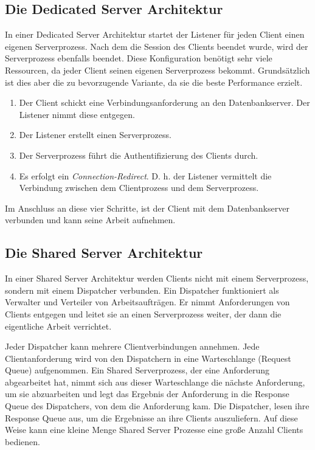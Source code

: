      \subsection{Die Dedicated Server Architektur}
        In einer Dedicated Server Architektur startet der Listener für jeden Client einen eigenen Serverprozess. Nach dem die Session des Clients beendet wurde, wird der Serverprozess ebenfalls beendet. Diese Konfiguration benötigt sehr viele Ressourcen, da jeder Client seinen eigenen Serverprozess bekommt. Grundsätzlich ist dies aber die zu bevorzugende Variante, da sie die beste Performance erzielt.
        \begin{enumerate}
          \item Der Client schickt eine Verbindungsanforderung an den Datenbankserver. Der Listener nimmt diese entgegen.
          \item Der Listener erstellt einen Serverprozess.
          \item Der Serverprozess führt die Authentifizierung des Clients durch.
          \item Es erfolgt ein \textit{Connection-Redirect}. D. h. der Listener vermittelt die Verbindung zwischen dem Clientprozess und dem Serverprozess.
        \end{enumerate}
        Im Anschluss an diese vier Schritte, ist der Client mit dem Datenbankserver verbunden und kann seine Arbeit aufnehmen.
      \subsection{Die Shared Server Architektur}
        In einer Shared Server Architektur werden Clients nicht mit einem Serverprozess, sondern mit einem Dispatcher verbunden. Ein Dispatcher funktioniert als Verwalter und Verteiler von Arbeitsaufträgen. Er nimmt Anforderungen von Clients entgegen und leitet sie an einen Serverprozess weiter, der dann die eigentliche Arbeit verrichtet.


        Jeder Dispatcher kann mehrere Clientverbindungen annehmen. Jede Clientanforderung wird von den Dispatchern in eine Warteschlange (Request Queue) aufgenommen. Ein Shared Serverprozess, der eine Anforderung abgearbeitet hat, nimmt sich aus dieser Warteschlange die nächste Anforderung, um sie abzuarbeiten und legt das Ergebnis der Anforderung in die Response Queue des Dispatchers, von dem die Anforderung kam. Die Dispatcher, lesen ihre Response Queue aus, um die Ergebnisse an ihre Clients auszuliefern. Auf diese Weise kann eine kleine Menge Shared Server Prozesse eine große Anzahl Clients bedienen.

